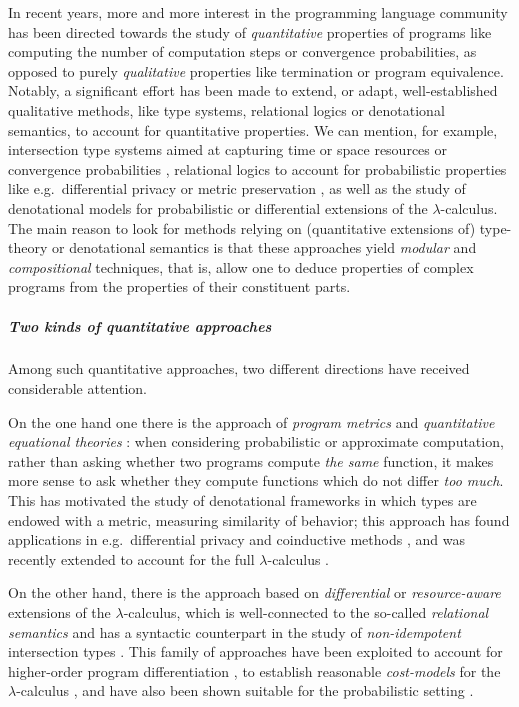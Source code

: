 
In recent years, more and more interest in the programming language community has been directed towards the study of \emph{quantitative} properties of programs like computing the number of computation steps or convergence probabilities, 
as opposed to purely \emph{qualitative} properties like termination or program equivalence. 
Notably, a significant effort has been made to extend, or adapt, well-established qualitative methods, like type systems, relational logics or denotational semantics, to account for quantitative properties. We can mention, for example, 
intersection type systems aimed at capturing time or space resources \cite{decarvalho2018, Accattoli2022} or convergence probabilities \cite{Breuvart2018, PistoneLICS2022},  relational logics to account for probabilistic properties like e.g.~differential privacy \cite{Barthe_2012} or metric preservation \cite{Reed2010, dallago}, as well as the study of denotational models for 
probabilistic \cite{Ehrhard2011, Staton2017} or differential \cite{difflambda} extensions of the $\lambda$-calculus. 
The main reason to look for methods relying on (quantitative extensions of) type-theory or denotational semantics is that these approaches yield \emph{modular} and \emph{compositional} techniques, that is, allow one to deduce properties of complex programs from the properties of their constituent parts.   

\subparagraph*{Two kinds of quantitative approaches}

Among such quantitative approaches, two different directions have received considerable attention.

On the one hand one there is the approach of \emph{program metrics} \cite{Reed2010, Gaboardi2017, Gabo2019} and \emph{quantitative equational theories} \cite{Plotk}: when considering probabilistic or approximate computation, rather than asking whether two programs compute \emph{the same} function, it makes more sense to ask   whether they compute functions which do not differ \emph{too much}. This has motivated the study of denotational frameworks in which types are endowed with a metric, measuring similarity of behavior; this approach has found  applications in e.g.~differential privacy \cite{Reed2010} and coinductive methods \cite{Bonchi2018}, and was recently extended to account for the full $\lambda$-calculus \cite{Geoffroy2020, PistoneLICS, PistoneFSCD2022}.

On the other hand, there is the approach based on \emph{differential} \cite{difflambda} or \emph{resource-aware} \cite{Boudol1993} extensions of the $\lambda$-calculus, which is well-connected to the so-called \emph{relational semantics} \cite{Manzo2012, Manzo2013, dill} and has a syntactic counterpart in the study of \emph{non-idempotent} intersection types \cite{decarvalho2018, Mazza2016}. This family of approaches have been exploited to account for higher-order program differentiation \cite{difflambda}, to establish reasonable \emph{cost-models} for the $\lambda$-calculus \cite{Accattoli2021}, and have also been shown suitable for the probabilistic setting \cite{Manzo2013, Breuvart2018, PistoneLICS2022}. 


